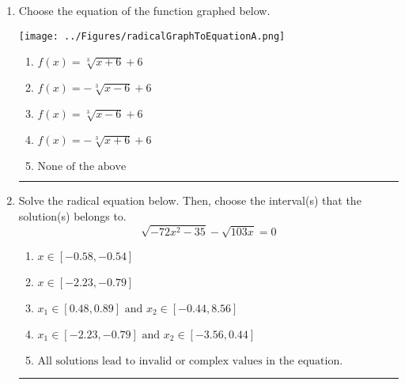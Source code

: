 \documentclass[14pt]{extbook}
\newcommand{\litem}[1]{\item#1\hspace*{-1cm}\rule{\textwidth}{0.4pt}}
\begin{document}
\begin{enumerate}
{\begin{enumerate}[label=\Alph*.]
\end{enumerate} }
\litem{
Choose the equation of the function graphed below.
\begin{center}
    \texttt{[image: ../Figures/radicalGraphToEquationA.png]}
\end{center}
\begin{enumerate}[label=\Alph*.]
\item \( f(x) = \sqrt[3]{x + 6} + 6 \)
\item \( f(x) = - \sqrt[3]{x - 6} + 6 \)
\item \( f(x) = \sqrt[3]{x - 6} + 6 \)
\item \( f(x) = - \sqrt[3]{x + 6} + 6 \)
\item \( \text{None of the above} \)

\end{enumerate} }
\litem{
Solve the radical equation below. Then, choose the interval(s) that the solution(s) belongs to.\[ \sqrt{-72 x^2 - 35} - \sqrt{103 x} = 0 \]\begin{enumerate}[label=\Alph*.]
\item \( x \in [-0.58,-0.54] \)
\item \( x \in [-2.23,-0.79] \)
\item \( x_1 \in [0.48, 0.89] \text{ and } x_2 \in [-0.44,8.56] \)
\item \( x_1 \in [-2.23, -0.79] \text{ and } x_2 \in [-3.56,0.44] \)
\item \( \text{All solutions lead to invalid or complex values in the equation.} \)


\end{enumerate}}
\end{enumerate}
\end{document}
